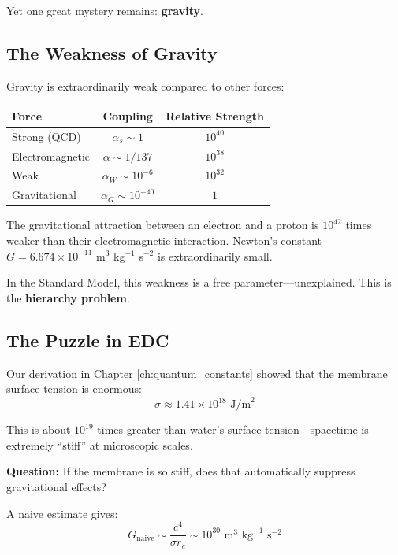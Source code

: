 Yet one great mystery remains: \textbf{gravity}.

\subsection{The Weakness of Gravity}

Gravity is extraordinarily weak compared to other forces:

\begin{center}
\begin{tabular}{|l|c|c|}
\hline
\textbf{Force} & \textbf{Coupling} & \textbf{Relative Strength} \\
\hline
Strong (QCD) & $\alpha_s \sim 1$ & $10^{40}$ \\
Electromagnetic & $\alpha \sim 1/137$ & $10^{38}$ \\
Weak & $\alpha_W \sim 10^{-6}$ & $10^{32}$ \\
Gravitational & $\alpha_G \sim 10^{-40}$ & $1$ \\
\hline
\end{tabular}
\end{center}

The gravitational attraction between an electron and a proton is $10^{42}$ times weaker than their electromagnetic interaction. Newton's constant $G = 6.674 \times 10^{-11}$ m$^3$ kg$^{-1}$ s$^{-2}$ is extraordinarily small.

In the Standard Model, this weakness is a free parameter—unexplained. This is the \textbf{hierarchy problem}.

\subsection{The Puzzle in EDC}

Our derivation in Chapter \ref{ch:quantum_constants} showed that the membrane surface tension is enormous:
\begin{equation}
\sigma \approx 1.41 \times 10^{18} \text{ J/m}^2
\end{equation}

This is about $10^{19}$ times greater than water's surface tension—spacetime is extremely ``stiff'' at microscopic scales.

\textbf{Question:} If the membrane is so stiff, does that automatically suppress gravitational effects?

A naive estimate gives:
\begin{equation}
G_{\text{naive}} \sim \frac{c^4}{\sigma r_e} \sim 10^{30} \text{ m}^3 \text{ kg}^{-1} \text{ s}^{-2}
\end{equation}

